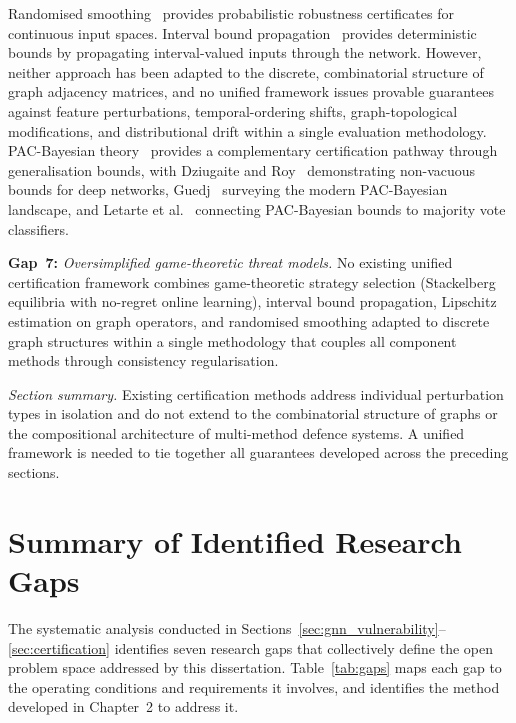 Randomised smoothing~\cite{Cohen2019,Salman2019} provides probabilistic robustness certificates for continuous input spaces. Interval bound propagation~\cite{Gowal2019,Wong2018} provides deterministic bounds by propagating interval-valued inputs through the network. However, neither approach has been adapted to the discrete, combinatorial structure of graph adjacency matrices, and no unified framework issues provable guarantees against feature perturbations, temporal-ordering shifts, graph-topological modifications, and distributional drift within a single evaluation methodology. PAC-Bayesian theory~\cite{McAllester1999,Catoni2007} provides a complementary certification pathway through generalisation bounds, with Dziugaite and Roy~\cite{Dziugaite2017} demonstrating non-vacuous bounds for deep networks, Guedj~\cite{Guedj2019} surveying the modern PAC-Bayesian landscape, and Letarte et al.~\cite{Letarte2019} connecting PAC-Bayesian bounds to majority vote classifiers.

\medskip
\noindent\textbf{Gap~7:} \emph{Oversimplified game-theoretic threat models.} No existing unified certification framework combines game-theoretic strategy selection (Stackelberg equilibria with no-regret online learning), interval bound propagation, Lipschitz estimation on graph operators, and randomised smoothing adapted to discrete graph structures within a single methodology that couples all component methods through consistency regularisation.

\medskip
\noindent\textit{Section summary.} Existing certification methods address individual perturbation types in isolation and do not extend to the combinatorial structure of graphs or the compositional architecture of multi-method defence systems. A unified framework is needed to tie together all guarantees developed across the preceding sections.


\section{Summary of Identified Research Gaps}
\label{sec:gap_summary}

The systematic analysis conducted in Sections~\ref{sec:gnn_vulnerability}--\ref{sec:certification} identifies seven research gaps that collectively define the open problem space addressed by this dissertation. Table~\ref{tab:gaps} maps each gap to the operating conditions and requirements it involves, and identifies the method developed in Chapter~2 to address it.

